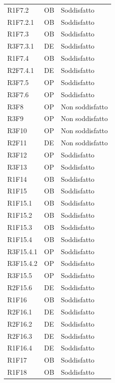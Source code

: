 {\begin{longtable}{C{2.5cm} C{2cm} C{3.5cm}}
R1F7.2 & OB & Soddisfatto\\
R1F7.2.1 & OB & Soddisfatto\\
R1F7.3 & OB & Soddisfatto\\
R3F7.3.1 & DE & Soddisfatto\\
R1F7.4 &  OB & Soddisfatto\\
R2F7.4.1 & DE & Soddisfatto\\
R3F7.5 & OP & Soddisfatto\\
R3F7.6 & OP & Soddisfatto\\
R3F8 & OP & Non soddisfatto\\
R3F9 & OP & Non soddisfatto\\
R3F10 & OP & Non soddisfatto\\
R2F11 & DE & Non soddisfatto\\
R3F12 & OP & Soddisfatto\\
R3F13 & OP & Soddisfatto\\
R1F14 & OB & Soddisfatto\\
R1F15 & OB & Soddisfatto\\
R1F15.1 & OB & Soddisfatto\\
R1F15.2 & OB & Soddisfatto\\
R1F15.3 & OB & Soddisfatto\\
R1F15.4 & OB & Soddisfatto\\
R3F15.4.1 & OP & Soddisfatto\\
R3F15.4.2 & OP & Soddisfatto\\
R3F15.5 & OP & Soddisfatto\\
R2F15.6 & DE & Soddisfatto\\
R1F16 & OB & Soddisfatto\\ 
R2F16.1 & DE & Soddisfatto\\
R2F16.2 & DE & Soddisfatto\\
R2F16.3 & DE & Soddisfatto\\
R1F16.4 & DE & Soddisfatto \\
R1F17 & OB & Soddisfatto\\
R1F18 & OB & Soddisfatto\\

\end{longtable}
}	
\newpage
